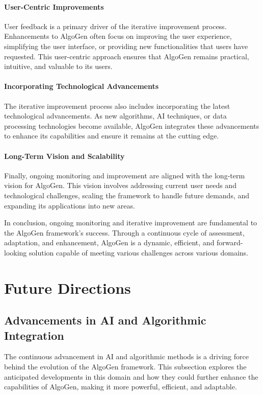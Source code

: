\documentclass{article}
\begin{document}
\paragraph{User-Centric Improvements}
User feedback is a primary driver of the iterative improvement process. Enhancements to AlgoGen often focus on improving the user experience, simplifying the user interface, or providing new functionalities that users have requested. This user-centric approach ensures that AlgoGen remains practical, intuitive, and valuable to its users.

\paragraph{Incorporating Technological Advancements}
The iterative improvement process also includes incorporating the latest technological advancements. As new algorithms, AI techniques, or data processing technologies become available, AlgoGen integrates these advancements to enhance its capabilities and ensure it remains at the cutting edge.

\paragraph{Long-Term Vision and Scalability}
Finally, ongoing monitoring and improvement are aligned with the long-term vision for AlgoGen. This vision involves addressing current user needs and technological challenges, scaling the framework to handle future demands, and expanding its applications into new areas.

In conclusion, ongoing monitoring and iterative improvement are fundamental to the AlgoGen framework’s success. Through a continuous cycle of assessment, adaptation, and enhancement, AlgoGen is a dynamic, efficient, and forward-looking solution capable of meeting various challenges across various domains.



\section{Future Directions}

\subsection{Advancements in AI and Algorithmic Integration}
The continuous advancement in AI and algorithmic methods is a driving force behind the evolution of the AlgoGen framework. This subsection explores the anticipated developments in this domain and how they could further enhance the capabilities of AlgoGen, making it more powerful, efficient, and adaptable.
\end{document}

